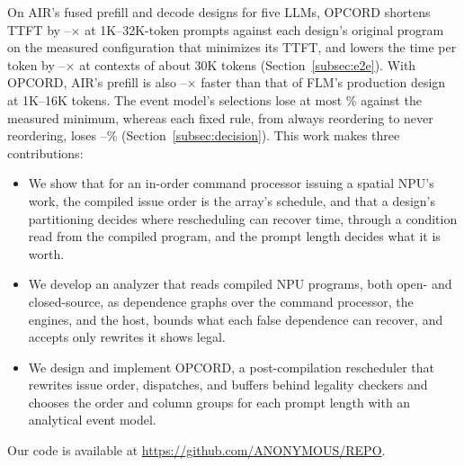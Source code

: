 On AIR's fused prefill and decode designs for five LLMs, OPCORD shortens TTFT by \PrefillGainLo--\PrefillGainHi$\times$ at 1K--32K-token prompts against each design's original program on the measured configuration that minimizes its TTFT, and lowers the time per token by \DecodeGainLo--\DecodeGainHi$\times$ at contexts of about 30K tokens (Section~\ref{subsec:e2e}).
With OPCORD, AIR's prefill is also \AbsGainLo--\AbsGainHi$\times$ faster than that of FLM's production design at 1K--16K tokens.
The event model's selections lose at most \FinalLossMax\% against the measured minimum, whereas each fixed rule, from always reordering to never reordering, loses \FinalFixedLo--\FinalFixedHi\% (Section~\ref{subsec:decision}).
This work makes three contributions:
\begin{itemize}
    \item We show that for an in-order command processor issuing a spatial NPU's work, the compiled issue order is the array's schedule, and that a design's partitioning decides where rescheduling can recover time, through a condition read from the compiled program, and the prompt length decides what it is worth.
    \item We develop an analyzer that reads compiled NPU programs, both open- and closed-source, as dependence graphs over the command processor, the engines, and the host, bounds what each false dependence can recover, and accepts only rewrites it shows legal.
    \item We design and implement OPCORD, a post-compilation rescheduler that rewrites issue order, dispatches, and buffers behind legality checkers and chooses the order and column groups for each prompt length with an analytical event model.
\end{itemize}

Our code is available at \url{https://github.com/ANONYMOUS/REPO}.
